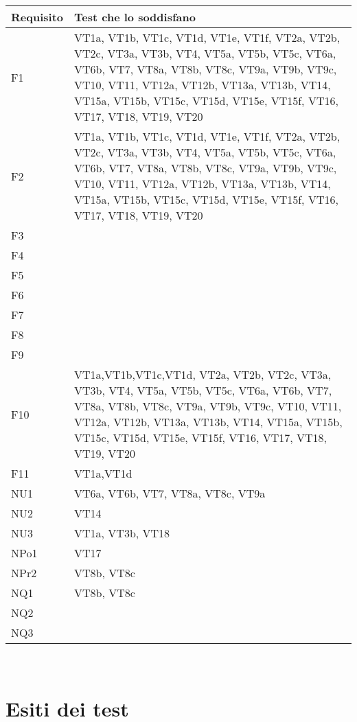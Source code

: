  \begin{center}
\begin{tabular}{|p{3cm}|p{8cm}|} \hline
\textbf{Requisito} & \textbf{Test che lo soddisfano}\\ \hline
F1  & VT1a, VT1b, VT1c, VT1d, VT1e, VT1f, VT2a, VT2b, VT2c, VT3a, VT3b, VT4, VT5a, VT5b, VT5c, VT6a, VT6b, VT7, VT8a, VT8b, VT8c, VT9a, VT9b, VT9c, VT10, VT11, VT12a, VT12b, VT13a, VT13b, VT14, VT15a, VT15b, VT15c, VT15d, VT15e, VT15f, VT16, VT17, VT18, VT19, VT20\\ \hline
F2  &  VT1a, VT1b, VT1c, VT1d, VT1e, VT1f, VT2a, VT2b, VT2c, VT3a, VT3b, VT4, VT5a, VT5b, VT5c, VT6a, VT6b, VT7, VT8a, VT8b, VT8c, VT9a, VT9b, VT9c, VT10, VT11, VT12a, VT12b, VT13a, VT13b, VT14, VT15a, VT15b, VT15c, VT15d, VT15e, VT15f, VT16, VT17, VT18, VT19, VT20\\ \hline
F3  &  \\ \hline
F4  &  \\ \hline
F5  &  \\ \hline
F6  &  \\ \hline
F7  &  \\ \hline
F8  &  \\ \hline
F9  &  \\ \hline
F10 & VT1a,VT1b,VT1c,VT1d, VT2a, VT2b, VT2c, VT3a, VT3b, VT4, VT5a, VT5b, VT5c, VT6a, VT6b, VT7, VT8a, VT8b, VT8c, VT9a, VT9b, VT9c, VT10, VT11, VT12a, VT12b, VT13a, VT13b, VT14, VT15a, VT15b, VT15c, VT15d, VT15e, VT15f, VT16, VT17, VT18, VT19, VT20 \\ \hline
F11 & VT1a,VT1d \\ \hline
NU1 &  VT6a, VT6b, VT7, VT8a, VT8c, VT9a\\ \hline
NU2 &  VT14\\ \hline
NU3 &  VT1a, VT3b, VT18\\ \hline
NPo1 &  VT17\\ \hline
NPr2 &  VT8b, VT8c\\ \hline
NQ1 & VT8b, VT8c  \\ \hline
NQ2 &  \\ \hline
NQ3 &  \\ \hline
\end{tabular} \\
\end{center}



\chapter{Esiti dei test}
